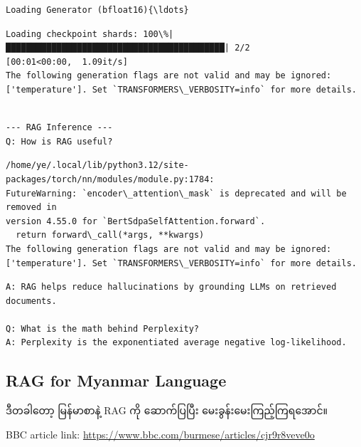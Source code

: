 \documentclass[11pt]{article}
\begin{document}
    \begin{Verbatim}[commandchars=\\\{\}]
Loading Generator (bfloat16){\ldots}
    \end{Verbatim}

    \begin{Verbatim}[commandchars=\\\{\}]
Loading checkpoint shards: 100\%|███████████████████████████████████████████| 2/2
[00:01<00:00,  1.09it/s]
The following generation flags are not valid and may be ignored:
['temperature']. Set `TRANSFORMERS\_VERBOSITY=info` for more details.
    \end{Verbatim}

    \begin{Verbatim}[commandchars=\\\{\}]

--- RAG Inference ---
Q: How is RAG useful?
    \end{Verbatim}

    \begin{Verbatim}[commandchars=\\\{\}]
/home/ye/.local/lib/python3.12/site-packages/torch/nn/modules/module.py:1784:
FutureWarning: `encoder\_attention\_mask` is deprecated and will be removed in
version 4.55.0 for `BertSdpaSelfAttention.forward`.
  return forward\_call(*args, **kwargs)
The following generation flags are not valid and may be ignored:
['temperature']. Set `TRANSFORMERS\_VERBOSITY=info` for more details.
    \end{Verbatim}

    \begin{Verbatim}[commandchars=\\\{\}]
A: RAG helps reduce hallucinations by grounding LLMs on retrieved documents.

Q: What is the math behind Perplexity?
A: Perplexity is the exponentiated average negative log-likelihood.
    \end{Verbatim}

    \hypertarget{rag-for-myanmar-language}{%
\subsection{RAG for Myanmar Language}\label{rag-for-myanmar-language}}

{\burmesefont ဒီတခါတော့} {\burmesefont မြန်မာစာနဲ့} RAG {\burmesefont ကို} {\burmesefont ဆောက်ပြပြီး} {\burmesefont မေးခွန်းမေးကြည့်ကြရအောင်။}

BBC article link:
\url{https://www.bbc.com/burmese/articles/cjr9r8veve0o}
\end{document}
